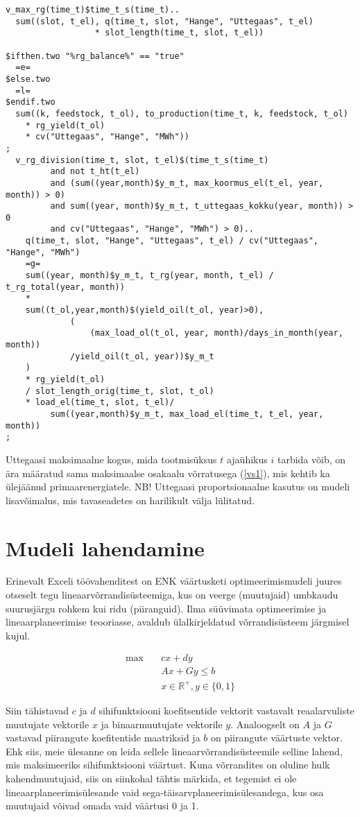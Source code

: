 \documentclass[10pt,a4paper]{article}
\begin{document}
\begin{verbatim}
v_max_rg(time_t)$time_t_s(time_t)..
  sum((slot, t_el), q(time_t, slot, "Hange", "Uttegaas", t_el)
                  * slot_length(time_t, slot, t_el))

$ifthen.two "%rg_balance%" == "true"
  =e=
$else.two
  =l=
$endif.two
  sum((k, feedstock, t_ol), to_production(time_t, k, feedstock, t_ol)
    * rg_yield(t_ol)
    * cv("Uttegaas", "Hange", "MWh"))
;
  v_rg_division(time_t, slot, t_el)$(time_t_s(time_t)
         and not t_ht(t_el)
         and (sum((year,month)$y_m_t, max_koormus_el(t_el, year, month)) > 0)
         and sum((year, month)$y_m_t, t_uttegaas_kokku(year, month)) > 0
         and cv("Uttegaas", "Hange", "MWh") > 0)..
    q(time_t, slot, "Hange", "Uttegaas", t_el) / cv("Uttegaas", "Hange", "MWh")
    =g=
    sum((year, month)$y_m_t, t_rg(year, month, t_el) / t_rg_total(year, month))
    *
    sum((t_ol,year,month)$(yield_oil(t_ol, year)>0),
             (
                 (max_load_ol(t_ol, year, month)/days_in_month(year, month))
             /yield_oil(t_ol, year))$y_m_t
    )
    * rg_yield(t_ol)
    / slot_length_orig(time_t, slot, t_ol)
    * load_el(time_t, slot, t_el)/
         sum((year,month)$y_m_t, max_load_el(time_t, t_el, year, month))
;
\end{verbatim}
Uttegaasi maksimaalne kogus, mida tootmisüksus $t$ ajaühikus $i$ tarbida võib, on ära määratud sama maksimaalse osakaalu võrratusega (\ref{vs1}), mis kehtib ka ülejäänud primaarenergiatele. NB! Uttegaasi proportsionaalne kasutus on mudeli lisavõimalus, mis tavaseadetes on harilikult välja lülitatud.

\section{Mudeli lahendamine}
\label{sec:lahendamine}
Erinevalt Exceli töövahenditest on ENK väärtusketi optimeerimismudeli juures otseselt tegu lineaarvõrrandisüsteemiga, kus on veerge (muutujaid) umbkaudu suurusjärgu rohkem kui ridu (piiranguid). Ilma süüvimata optimeerimise ja lineaarplaneerimise teooriasse, avaldub ülalkirjeldatud võrrandisüsteem järgmisel kujul.

\printindex
\begin{align}
\mathrm{max} \quad &cx + dy \nonumber\\
&Ax + Gy \leq b \nonumber \\
&x \in \mathbb{R^+}, y \in \{0,1\} \nonumber
\end{align}

Siin tähistavad $c$ ja $d$ sihifunktsiooni koefitsentide vektorit vastavalt reaalarvuliste muutujate vektorile $x$ ja binaarmuutujate vektorile $y$. Analoogselt on $A$ ja $G$ vastavad piirangute koefitentide maatriksid ja $b$ on piirangute väärtuste vektor.
Ehk siis, meie ülesanne on leida sellele lineaarvõrrandisüsteemile selline lahend, mis maksimeeriks sihifunktsiooni väärtust. Kuna võrrandites on oluline hulk kahendmuutujaid, siis on siinkohal tähtis märkida, et tegemist ei ole lineaarplaneerimisülesande vaid sega-täisarvplaneerimisülesandega, kus osa muutujaid võivad omada vaid väärtusi 0 ja 1. 
\end{document}
